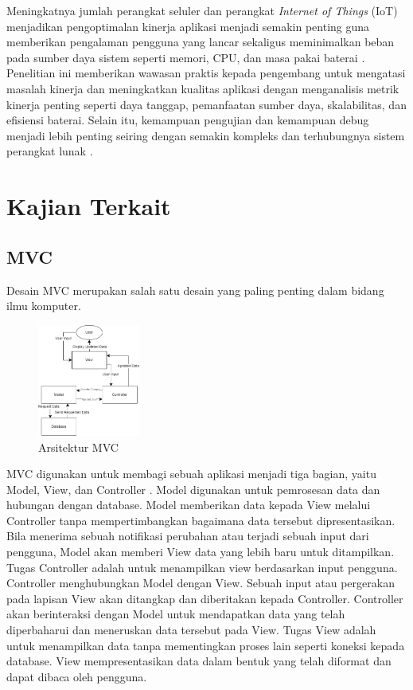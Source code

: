 \documentclass[conference]{IEEEtran}
\begin{document}
Meningkatnya jumlah perangkat seluler dan perangkat \textit{Internet of Things} (IoT) menjadikan pengoptimalan kinerja aplikasi menjadi semakin penting guna memberikan pengalaman pengguna yang lancar sekaligus meminimalkan beban pada sumber daya sistem seperti memori, CPU, dan masa pakai baterai \cite{Anhar_Swari_Aditiawan_2024}. Penelitian ini memberikan wawasan praktis kepada pengembang untuk mengatasi masalah kinerja dan meningkatkan kualitas aplikasi dengan menganalisis metrik kinerja penting seperti daya tanggap, pemanfaatan sumber daya, skalabilitas, dan efisiensi baterai. Selain itu, kemampuan pengujian dan kemampuan debug menjadi lebih penting seiring dengan semakin kompleks dan terhubungnya sistem perangkat lunak \cite{Gunawan_Lawi_Adnan_2016}.

\section{Kajian Terkait}
\subsection{MVC}
Desain MVC merupakan salah satu desain yang paling penting dalam bidang ilmu komputer\cite{bucanek2009model}.
\begin{figure}[h]
    \centering
    \includegraphics[width = 0.3\textwidth
    ]{images/MVC1.png}
    \caption{Arsitektur MVC}
    \label{fig:enter-label}
\end{figure}

MVC digunakan untuk membagi sebuah aplikasi menjadi tiga bagian, yaitu Model, View, dan Controller \cite{qureshi2014comparison}. Model digunakan untuk pemrosesan data dan hubungan dengan database. Model memberikan data kepada View melalui Controller tanpa mempertimbangkan bagaimana data tersebut dipresentasikan. Bila menerima sebuah notifikasi perubahan atau terjadi sebuah input dari pengguna, Model akan memberi View data yang lebih baru untuk ditampilkan. Tugas Controller adalah untuk menampilkan view berdasarkan input pengguna. Controller menghubungkan Model dengan View. Sebuah input atau pergerakan pada lapisan View akan ditangkap dan diberitakan kepada Controller. Controller akan berinteraksi dengan Model untuk mendapatkan data yang telah diperbaharui dan meneruskan data tersebut pada View. Tugas View adalah untuk menampilkan data tanpa mementingkan proses lain seperti koneksi kepada database. View mempresentasikan data dalam bentuk yang telah diformat dan dapat dibaca oleh pengguna.
\end{document}
